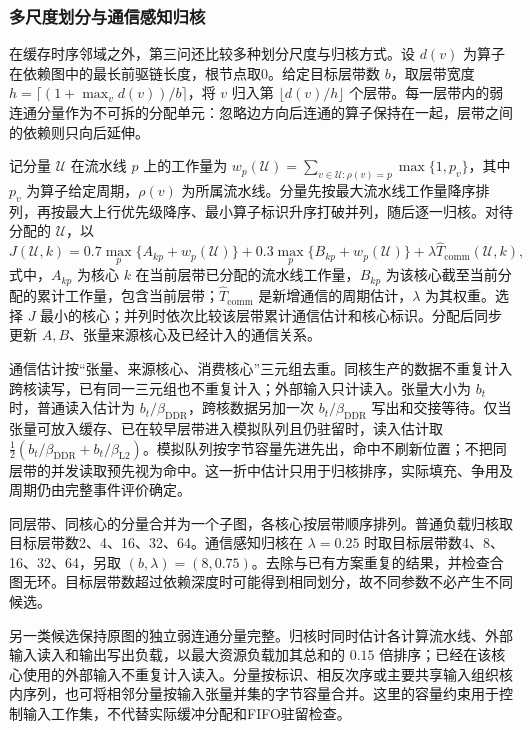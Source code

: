 \subsubsection{多尺度划分与通信感知归核}
\label{subsec:q3_portfolio}
在缓存时序邻域之外，第三问还比较多种划分尺度与归核方式。设 $d(v)$ 为算子在依赖图中的最长前驱链长度，根节点取0。给定目标层带数 $b$，取层带宽度 $h=\lceil(1+\max_v d(v))/b\rceil$，将 $v$ 归入第 $\lfloor d(v)/h\rfloor$ 个层带。每一层带内的弱连通分量作为不可拆的分配单元：忽略边方向后连通的算子保持在一起，层带之间的依赖则只向后延伸。

记分量 $\mathcal U$ 在流水线 $p$ 上的工作量为 $w_p(\mathcal U)=\sum_{v\in\mathcal U:\rho(v)=p}\max\{1,p_v\}$，其中 $p_v$ 为算子给定周期，$\rho(v)$ 为所属流水线。分量先按最大流水线工作量降序排列，再按最大上行优先级降序、最小算子标识升序打破并列，随后逐一归核。对待分配的 $\mathcal U$，以
\begin{equation}
 J(\mathcal U,k)=0.7\max_p\{A_{kp}+w_p(\mathcal U)\}
       +0.3\max_p\{B_{kp}+w_p(\mathcal U)\}
       +\lambda\widehat T_{\mathrm{comm}}(\mathcal U,k),
 \label{eq:q3_band_score}
\end{equation}
\noindent 式中，$A_{kp}$ 为核心 $k$ 在当前层带已分配的流水线工作量，$B_{kp}$ 为该核心截至当前分配的累计工作量，包含当前层带；$\widehat T_{\mathrm{comm}}$ 是新增通信的周期估计，$\lambda$ 为其权重。选择 $J$ 最小的核心；并列时依次比较该层带累计通信估计和核心标识。分配后同步更新 $A,B$、张量来源核心及已经计入的通信关系。

通信估计按“张量、来源核心、消费核心”三元组去重。同核生产的数据不重复计入跨核读写，已有同一三元组也不重复计入；外部输入只计读入。张量大小为 $b_t$ 时，普通读入估计为 $b_t/\beta_{\mathrm{DDR}}$，跨核数据另加一次 $b_t/\beta_{\mathrm{DDR}}$ 写出和交接等待。仅当张量可放入缓存、已在较早层带进入模拟队列且仍驻留时，读入估计取 $\tfrac12(b_t/\beta_{\mathrm{DDR}}+b_t/\beta_{\mathrm{L2}})$。模拟队列按字节容量先进先出，命中不刷新位置；不把同层带的并发读取预先视为命中。这一折中估计只用于归核排序，实际填充、争用及周期仍由完整事件评价确定。

同层带、同核心的分量合并为一个子图，各核心按层带顺序排列。普通负载归核取目标层带数2、4、16、32、64。通信感知归核在 $\lambda=0.25$ 时取目标层带数4、8、16、32、64，另取 $(b,\lambda)=(8,0.75)$。去除与已有方案重复的结果，并检查合图无环。目标层带数超过依赖深度时可能得到相同划分，故不同参数不必产生不同候选。

另一类候选保持原图的独立弱连通分量完整。归核时同时估计各计算流水线、外部输入读入和输出写出负载，以最大资源负载加其总和的 $0.15$ 倍排序；已经在该核心使用的外部输入不重复计入读入。分量按标识、相反次序或主要共享输入组织核内序列，也可将相邻分量按输入张量并集的字节容量合并。这里的容量约束用于控制输入工作集，不代替实际缓冲分配和FIFO驻留检查。

